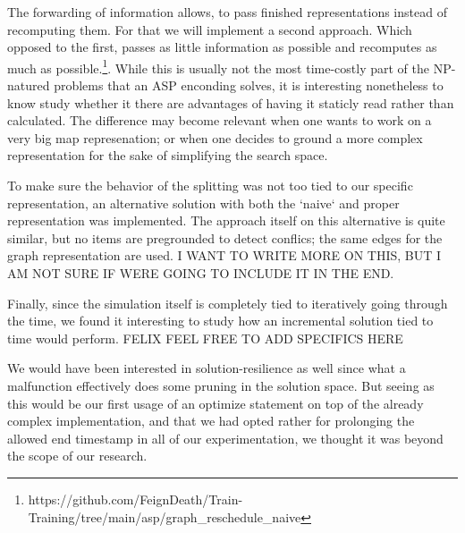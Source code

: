 The forwarding of information allows, to pass finished representations instead of recomputing them. For that we will implement a second approach. Which opposed to the first, passes as little information as possible and recomputes as much as possible.\footnote{https://github.com/FeignDeath/Train-Training/tree/main/asp/graph\_reschedule\_naive}. While this is usually not the most time-costly part of the NP-natured problems that an ASP enconding solves, it is interesting nonetheless to know study whether it there are advantages of having it staticly read rather than calculated. The difference may become relevant when one wants to work on a very big map represenation; or when one decides to ground a more complex representation for the sake of simplifying the search space.





To make sure the behavior of the splitting was not too tied to our specific representation, an alternative solution with both the `naive` and proper representation was implemented. The approach itself on this alternative is quite similar, but no items are pregrounded to detect conflics; the same edges for the graph representation are used. 
\color{red}
I WANT TO WRITE MORE ON THIS, BUT I AM NOT SURE IF WERE GOING TO INCLUDE IT IN THE END.
\color{black}


Finally, since the simulation itself is completely tied to iteratively going through the time, we found it interesting to study how an incremental solution tied to time would perform. 
\color{red}FELIX FEEL FREE TO ADD SPECIFICS HERE
\color{black}

We would have been interested in solution-resilience as well since what a malfunction effectively does some pruning in the solution space. But seeing as this would be our first usage of an optimize statement on top of the already complex implementation, and that we had opted rather for prolonging the allowed end timestamp in all of our experimentation, we thought it was beyond the scope of our research.



